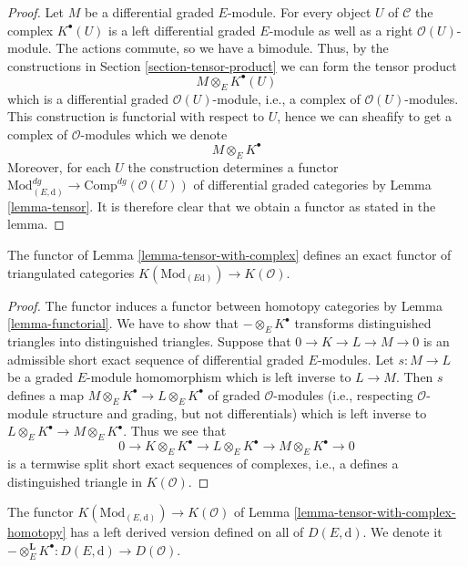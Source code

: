 \begin{proof}
Let $M$ be a differential graded $E$-module. For every object $U$ of
$\mathcal{C}$ the complex $K^\bullet(U)$ is a left differential
graded $E$-module as well as a right $\mathcal{O}(U)$-module.
The actions commute, so we have a bimodule.
Thus, by the constructions in Section \ref{section-tensor-product}
we can form the tensor product
$$
M \otimes_E K^\bullet(U)
$$
which is a differential graded $\mathcal{O}(U)$-module, i.e., a complex
of $\mathcal{O}(U)$-modules. This construction is functorial with respect
to $U$, hence we can sheafify to get a complex of $\mathcal{O}$-modules
which we denote
$$
M \otimes_E K^\bullet
$$
Moreover, for each $U$ the construction determines a functor
$\text{Mod}^{dg}_{(E, \text{d})} \to \text{Comp}^{dg}(\mathcal{O}(U))$
of differential graded categories by Lemma \ref{lemma-tensor}.
It is therefore clear that we obtain a functor as stated in the lemma.
\end{proof}

\begin{lemma}
\label{lemma-tensor-with-complex-homotopy}
The functor of Lemma \ref{lemma-tensor-with-complex} defines an exact functor
of triangulated categories
$K(\text{Mod}_{(E \text{d})}) \to K(\mathcal{O})$.
\end{lemma}

\begin{proof}
The functor induces a functor between homotopy categories by
Lemma \ref{lemma-functorial}.
We have to show that $- \otimes_E K^\bullet$ transforms distinguished
triangles into distinguished triangles.
Suppose that $0 \to K \to L \to M \to 0$ is an admissible short
exact sequence of differential graded $E$-modules. Let $s : M \to L$ be
a graded $E$-module homomorphism which is left inverse to $L \to M$.
Then $s$ defines a map $M \otimes_E K^\bullet \to L \otimes_E K^\bullet$
of graded $\mathcal{O}$-modules (i.e., respecting $\mathcal{O}$-module
structure and grading, but not differentials)
which is left inverse to $L \otimes_E K^\bullet \to M \otimes_E K^\bullet$.
Thus we see that
$$
0 \to K \otimes_E K^\bullet \to L \otimes_E K^\bullet \to
M \otimes_E K^\bullet \to 0
$$
is a termwise split short exact sequences of complexes, i.e., a
defines a distinguished triangle in $K(\mathcal{O})$.
\end{proof}

\begin{lemma}
\label{lemma-tensor-with-complex-derived}
The functor $K(\text{Mod}_{(E, \text{d})}) \to K(\mathcal{O})$
of Lemma \ref{lemma-tensor-with-complex-homotopy} has a left derived
version defined on all of $D(E, \text{d})$. We denote it
$- \otimes_E^\mathbf{L} K^\bullet : D(E, \text{d}) \to D(\mathcal{O})$.
\end{lemma}

